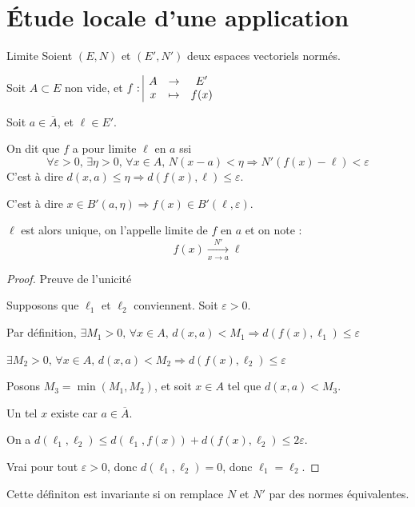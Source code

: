 \section{Étude locale d'une application}

\begin{definition}{Limite}{}
    Soient $(E, N)$ et $(E', N')$ deux espaces vectoriels normés. 

    Soit $A \subset E$ non vide, et $f: \space \begin{array}{|ccc} \displaystyle A & \to & \displaystyle E' \\ \displaystyle x & \mapsto & \displaystyle f(x) \end{array}$

    Soit $a \in \overline A$, et $\ell \in E'$.

    On dit que $f$ a pour limite $\ell$ en $a$ ssi 
    \[\forall \varepsilon > 0, \, \exists \eta > 0, \, \forall x \in A, \, N(x - a) < \eta \Rightarrow N'(f(x) - \ell) < \varepsilon\]
    C'est à dire $d(x, a) \leqslant \eta \Rightarrow d(f(x), \ell) \leqslant \varepsilon$.

    C'est à dire $x \in B'(a, \eta) \Rightarrow f(x) \in B'(\ell, \varepsilon)$.

    $\ell$ est alors unique, on l'appelle limite de $f$ en $a$ et on note :
    \[f(x) \xrightarrow[x \to a ]{N'} \ell\]
\end{definition}

\begin{proof}
    Preuve de l'unicité 

    Supposons que $\ell_1$ et $\ell_2$ conviennent. Soit $\varepsilon > 0$.

    Par définition, $\exists M_1 > 0, \, \forall x \in A, \, d(x, a) < M_1  \Rightarrow d(f(x), \ell_1) \leqslant \varepsilon$

    $\exists M_2 > 0, \, \forall x \in A, \, d(x, a) < M_2  \Rightarrow d(f(x), \ell_2) \leqslant \varepsilon$

    Posons $M_3 = \min(M_1, M_2)$, et soit $x \in A$ tel que $d(x, a) < M_3$.

    Un tel $x$ existe car $a \in \overline A$.

    On a $d(\ell_1, \ell_2) \leqslant d(\ell_1, f(x)) + d(f(x), \ell_2) \leqslant 2 \varepsilon$.

    Vrai pour tout $\varepsilon > 0$, donc $d(\ell_1, \ell_2) = 0$, donc $\ell_1 = \ell_2$.
\end{proof}

\begin{remarque}
    Cette définiton est invariante si on remplace $N$ et $N'$ par des normes équivalentes.
\end{remarque}

